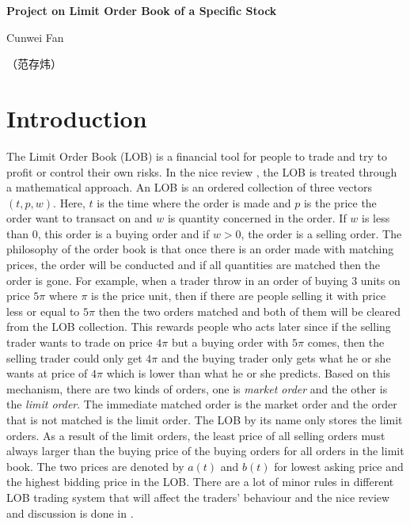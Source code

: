 \documentclass[letterpaper,12pt]{article}
\numberwithin{equation}{section}
\begin{document}
\clearpage
\thispagestyle{empty}
\begin{center}
    \Large{\textbf{Project on Limit Order Book of a Specific Stock}}\\
    \large{Cunwei Fan \begin{CJK}{UTF8}{gkai}{（范存炜）}\end{CJK}}
\end{center}


\tableofcontents

\newpage 
\section{Introduction}

The Limit Order Book (LOB) is a financial tool for people to trade and try to profit or control their own risks. In the nice review \cite{gould2013limit}, the LOB is treated through a mathematical approach. An LOB is an ordered collection of three vectors $(t, p, w)$. Here, $t$ is the time where the order is made and $p$ is the price the order want to transact on and $w$ is quantity concerned in the order. If $w$ is less than $0$, this order is a buying order and if $w >0$, the order is a selling order. The philosophy of the order book is that once there is an order made with matching prices, the order will be conducted and if all quantities are matched then the order is gone. For example, when a trader throw in an order of buying $3$ units on price $5\pi $ where $\pi$ is the price unit, then if there are people selling it with price less or equal to $5\pi$ then the two orders matched and both of them will be cleared from the LOB collection. This rewards people who acts later since if the selling trader wants to trade on price $4\pi$ but a buying order with $5\pi$ comes, then the selling trader could only get $4\pi$ and the buying trader only gets what he or she wants at price of $4\pi$ which is lower than what he or she predicts. Based on this mechanism, there are two kinds of orders, one is \textit{market order} and the other is the \textit{limit order}. The immediate matched order is the market order and the order that is not matched is the limit order. The LOB by its name only stores the limit orders. As a result of the limit orders, the least price of all selling orders must always larger than the buying price of the buying orders for all orders in the limit book. The two prices are denoted by $a(t)$ and $b(t)$ for lowest asking price and the highest bidding price in the LOB. There are a lot of minor rules in different LOB trading system that will affect the traders' behaviour and the nice review and discussion is done in \cite{gould2013limit}. 
\end{document}
